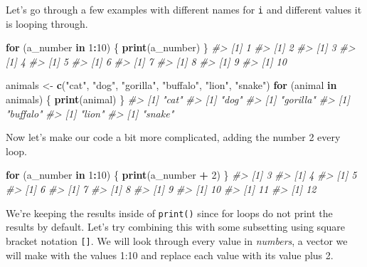 \documentclass[
  12pt,
]{book}
\newenvironment{Shaded}{\begin{snugshade}}{\end{snugshade}}
\newcommand{\CommentTok}[1]{\textcolor[rgb]{0.37,0.37,0.37}{\textit{#1}}}
\newcommand{\ControlFlowTok}[1]{\textcolor[rgb]{0.27,0.27,0.27}{\textbf{#1}}}
\newcommand{\DecValTok}[1]{\textcolor[rgb]{0.06,0.06,0.06}{#1}}
\newcommand{\KeywordTok}[1]{\textcolor[rgb]{0.27,0.27,0.27}{\textbf{#1}}}
\newcommand{\NormalTok}[1]{#1}
\newcommand{\OperatorTok}[1]{\textcolor[rgb]{0.43,0.43,0.43}{\textbf{#1}}}
\newcommand{\StringTok}[1]{\textcolor[rgb]{0.5,0.5,0.5}{#1}}
\begin{document}
Let's go through a few examples with different names for \texttt{i} and different values it is looping through.

\begin{Shaded}
\begin{Highlighting}[]
\ControlFlowTok{for}\NormalTok{ (a\_number }\ControlFlowTok{in} \DecValTok{1}\OperatorTok{:}\DecValTok{10}\NormalTok{) \{}
   \KeywordTok{print}\NormalTok{(a\_number)}
\NormalTok{\}}
\CommentTok{\#> [1] 1}
\CommentTok{\#> [1] 2}
\CommentTok{\#> [1] 3}
\CommentTok{\#> [1] 4}
\CommentTok{\#> [1] 5}
\CommentTok{\#> [1] 6}
\CommentTok{\#> [1] 7}
\CommentTok{\#> [1] 8}
\CommentTok{\#> [1] 9}
\CommentTok{\#> [1] 10}
\end{Highlighting}
\end{Shaded}

\begin{Shaded}
\begin{Highlighting}[]
\NormalTok{animals <{-}}\StringTok{ }\KeywordTok{c}\NormalTok{(}\StringTok{"cat"}\NormalTok{, }\StringTok{"dog"}\NormalTok{, }\StringTok{"gorilla"}\NormalTok{, }\StringTok{"buffalo"}\NormalTok{, }\StringTok{"lion"}\NormalTok{, }\StringTok{"snake"}\NormalTok{)}
\ControlFlowTok{for}\NormalTok{ (animal }\ControlFlowTok{in}\NormalTok{ animals) \{}
   \KeywordTok{print}\NormalTok{(animal)}
\NormalTok{\}}
\CommentTok{\#> [1] "cat"}
\CommentTok{\#> [1] "dog"}
\CommentTok{\#> [1] "gorilla"}
\CommentTok{\#> [1] "buffalo"}
\CommentTok{\#> [1] "lion"}
\CommentTok{\#> [1] "snake"}
\end{Highlighting}
\end{Shaded}

Now let's make our code a bit more complicated, adding the number 2 every loop.

\begin{Shaded}
\begin{Highlighting}[]
\ControlFlowTok{for}\NormalTok{ (a\_number }\ControlFlowTok{in} \DecValTok{1}\OperatorTok{:}\DecValTok{10}\NormalTok{) \{}
   \KeywordTok{print}\NormalTok{(a\_number }\OperatorTok{+}\StringTok{ }\DecValTok{2}\NormalTok{)}
\NormalTok{\}}
\CommentTok{\#> [1] 3}
\CommentTok{\#> [1] 4}
\CommentTok{\#> [1] 5}
\CommentTok{\#> [1] 6}
\CommentTok{\#> [1] 7}
\CommentTok{\#> [1] 8}
\CommentTok{\#> [1] 9}
\CommentTok{\#> [1] 10}
\CommentTok{\#> [1] 11}
\CommentTok{\#> [1] 12}
\end{Highlighting}
\end{Shaded}

We're keeping the results inside of \texttt{print()} since for loops do not print the results by default. Let's try combining this with some subsetting using square bracket notation \texttt{{[}{]}}. We will look through every value in \emph{numbers}, a vector we will make with the values 1:10 and replace each value with its value plus 2.
\end{document}
